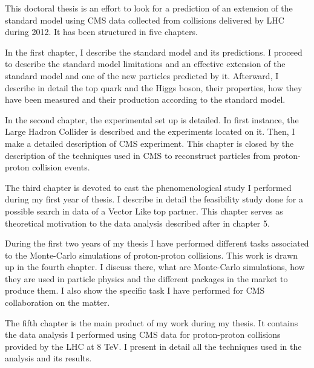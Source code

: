 This doctoral thesis is an effort to look for a prediction of an extension of the standard model using CMS data collected from collisions delivered by LHC during 2012. It has been structured in five chapters.

In the first chapter, I describe the standard model and its predictions. I proceed to describe the standard model limitations and an effective extension of the standard model and one of the new particles predicted by it. Afterward, I describe in detail the top quark and the Higgs boson, their properties, how they have been measured and their production according to the standard model.

In the second chapter, the experimental set up is detailed. In first instance, the Large Hadron Collider is described and the experiments located on it. Then, I make a detailed description of CMS experiment. This chapter is closed by the description of the techniques used in CMS to reconstruct particles from proton-proton collision events. 

The third chapter is devoted to cast the phenomenological study I performed during my first year of thesis. I describe in detail the feasibility study done for a possible search in data of a Vector Like top partner. This chapter serves as theoretical motivation to the data analysis described after in chapter 5.

During the first two years of my thesis I have performed different tasks associated to the Monte-Carlo simulations of proton-proton collisions. This work is drawn up in the fourth chapter. I discuss there, what are Monte-Carlo simulations, how they are used in particle physics and the different packages in the market to produce them. I also show the specific task I have performed for CMS collaboration on the matter.

The fifth chapter is the main product of my work during my thesis. It contains the data analysis I performed using CMS data for proton-proton collisions provided by the LHC at 8 TeV. I present in detail all the techniques used in the analysis and its results.